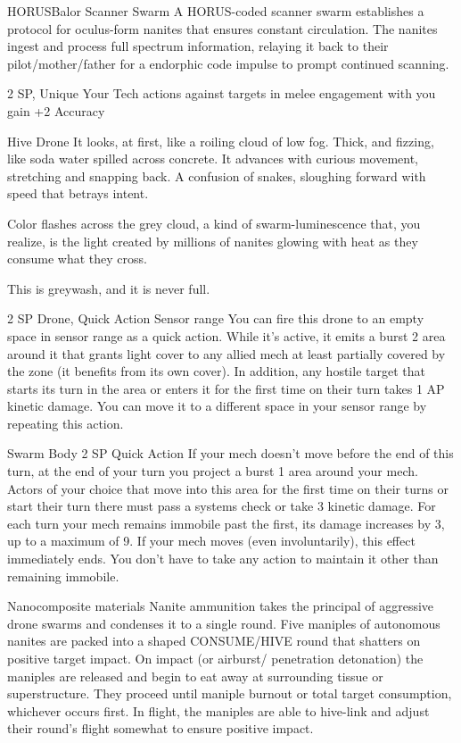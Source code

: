 \begin{mech}{HORUS}{Balor}
Scanner Swarm
A HORUS-coded scanner swarm establishes a protocol for oculus-form nanites that ensures constant circulation. The nanites ingest and process full spectrum information, relaying it back to their pilot/mother/father for a endorphic code impulse to prompt continued scanning.

2 SP, Unique
Your Tech actions against targets in melee engagement with you gain +2 Accuracy

Hive Drone
It looks, at first, like a roiling cloud of low fog. Thick, and fizzing, like soda water spilled across concrete. It advances with curious movement, stretching and snapping back. A confusion of snakes, sloughing forward with speed that betrays intent.

Color flashes across the grey cloud, a kind of swarm-luminescence that, you realize, is the light created by millions of nanites glowing with heat as they consume what they cross.

This is greywash, and it is never full.

2 SP
Drone, Quick Action
Sensor range
You can fire this drone to an empty space in sensor range as a quick action. While it's active, it emits a burst 2 area around it that grants light cover to any allied mech at least partially covered by the zone (it benefits from its own cover). In addition, any hostile target that starts its turn in the area or enters it for the first time on their turn takes 1 AP kinetic damage. You can move it to a different space in your sensor range by repeating this action.

Swarm Body
2 SP
Quick Action
If your mech doesn't move before the end of this turn, at the end of your turn you project a burst 1 area around your mech. Actors of your choice that move into this area for the first time on their turns or start their turn there must pass a systems check or take 3 kinetic damage. For each turn your mech remains immobile past the first, its damage increases by 3, up to a maximum of 9. If your mech moves (even involuntarily), this effect immediately ends. You don't have to take any action to maintain it other than remaining immobile.

Nanocomposite materials
Nanite ammunition takes the principal of aggressive drone swarms and condenses it to a single round. Five maniples of autonomous nanites are packed into a shaped CONSUME/HIVE round that shatters on positive target impact. On impact (or airburst/ penetration detonation) the maniples are released and begin to eat away at surrounding tissue or superstructure. They proceed until maniple burnout or total target consumption, whichever occurs first. In flight, the maniples are able to hive-link and adjust their round's flight somewhat to ensure positive impact.


\end{mech}
